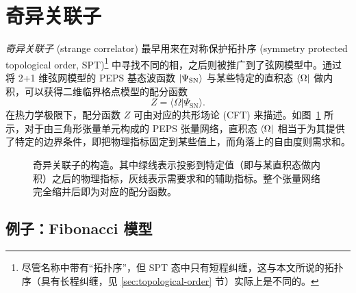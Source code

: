 \section{奇异关联子}
\label{sec:strange-correlator}

\emph{奇异关联子} (strange correlator) 最早用来在对称保护拓扑序 (symmetry protected topological order, SPT)\footnote{尽管名称中带有“拓扑序”，但 SPT 态中只有短程纠缠，这与本文所说的拓扑序（具有长程纠缠，见 \ref{sec:topological-order} 节）实际上是不同的。} 中寻找不同的相\cite{you2014wave}，之后则被推广到了弦网模型中\cite{vanhove2018mapping,lootens2019cardy,vanhove2022topological}。通过将 2+1 维弦网模型的 PEPS 基态波函数 $\ket{\Psi_\text{SN}}$ 与某些特定的直积态 $\bra{\Omega}$ 做内积，可以获得二维临界格点模型的配分函数
\begin{equation}
  Z = \langle\Omega|\Psi_\text{SN}\rangle.
\end{equation}
在热力学极限下，配分函数 $Z$ 可由对应的共形场论 (CFT) 来描述。如图~\ref{fig:peps-strange-correlator} 所示，对于由三角形张量单元构成的 PEPS 张量网络，直积态 $\bra{\Omega}$ 相当于为其提供了特定的边界条件，即把物理指标固定到某些值上，而角落上的自由度则需求和。

\begin{figure}[htb]
  \centering
  \caption[奇异关联子的构造]{奇异关联子的构造。其中绿线表示投影到特定值（即与某直积态做内积）之后的物理指标，灰线表示需要求和的辅助指标。整个张量网络完全缩并后即为对应的配分函数。}
  \label{fig:peps-strange-correlator}
\end{figure}

\subsection{例子：Fibonacci 模型}
\label{subsec:strange-correlator-fib}

